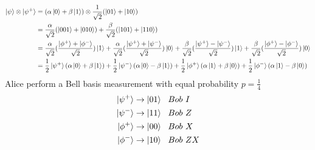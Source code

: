 \documentclass[]{article}
\theoremstyle{nonumberplain}
\begin{document}
\begin{equation*}
\begin{aligned}
	\ket{\psi}\otimes \ket{\psi^{+}} &= (\alpha \ket{0}+\beta\ket{1})\otimes \frac{1}{\sqrt{2}}(\ket{01}+\ket{10}) \\
												&= \frac{\alpha}{\sqrt{2}}(\ket{001}+\ket{010}) + \frac{\beta}{\sqrt{2}}(\ket{101}+\ket{110}) \\
												&= \frac{\alpha}{\sqrt{2}}(\frac{\ket{\phi^{+}}+\ket{\phi^{-}}}{\sqrt{2}})\ket{1} + \frac{\alpha}{\sqrt{2}}(\frac{\ket{\psi^{+}}+\ket{\psi^{-}}}{\sqrt{2}})\ket{0} + \frac{\beta}{\sqrt{2}}(\frac{\ket{\psi^{+}}-\ket{\psi^{-}}}{\sqrt{2}})\ket{1} + \frac{\beta}{\sqrt{2}}(\frac{\ket{\phi^{+}}-\ket{\phi^{-}}}{\sqrt{2}})\ket{0} \\
												&= \frac{1}{2}\ket{\psi^{+}} (\alpha\ket{0}+\beta\ket{1}) + \frac{1}{2}\ket{\psi^{-}} (\alpha\ket{0}-\beta\ket{1}) + \frac{1}{2}\ket{\phi^{+}} (\alpha\ket{1}+\beta\ket{0}) + \frac{1}{2}\ket{\phi^{-}} (\alpha\ket{1}-\beta\ket{0})
\end{aligned}
\end{equation*}
Alice perform a Bell basis measurement with equal probability $p=\frac{1}{4}$
\begin{equation*}
\begin{aligned}
	\ket{\psi^{+}} &\rightarrow \ket{01}\ \  Bob\ I \\ 
	\ket{\psi^{-}} &\rightarrow \ket{11} \ \  Bob\ Z \\
	\ket{\phi^{+}} &\rightarrow \ket{00} \ \  Bob\ X \\
	\ket{\phi^{-}} &\rightarrow \ket{10}  \ \  Bob\ ZX\\
\end{aligned}
\end{equation*}
\end{document}
